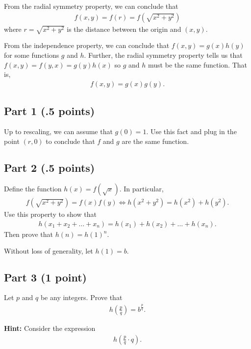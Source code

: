 \documentclass{article}
\begin{document}
From the radial symmetry property, we can conclude that
\begin{align}\label{eq:radial_symmetry}
f(x,y) = f(r) = f(\sqrt{x^2 + y^2})
\end{align}
where $r=\sqrt{x^2+y^2}$ is the distance between the origin and $(x,y)$.

From the independence property, we can conclude that $f(x,y) = g(x) h(y)$ for some functions $g$ and $h$.
Further, the radial symmetry property tells us that $f(x,y) = f(y,x) = g(y) h(x)$ so $g$ and $h$ must be the same function.
That is,
\begin{align}\label{eq:independence}
f(x,y) = g(x) g(y).
\end{align}

\subsection*{Part 1 (.5 points)} 

Up to rescaling, we can assume that $g(0)=1$.
Use this fact and plug in the point $(r,0)$ to conclude that $f$ and $g$ are the same function.

\subsection*{Part 2 (.5 points)}

Define the function $h(x) = f(\sqrt{x})$.
In particular,
\begin{align}\label{eq:define_h}
f(\sqrt{x^2 + y^2}) = f(x) f(y) \Leftrightarrow
h(x^2 + y^2) = h(x^2) + h(y^2).
\end{align}
Use this property to show that
\begin{align}\label{eq:h_linear}
h(x_1 + x_2 + \ldots + x_n) = h(x_1) + h(x_2) + \ldots + h(x_n).
\end{align}
Then prove that $h(n) = h(1)^n$.

Without loss of generality, let $h(1) = b$.

\subsection*{Part 3 (1 point)}

Let $p$ and $q$ be any integers.
Prove that 
\begin{align}\label{eq:to_prove}
h\left(\frac{p}{q}\right) = b^{\frac{p}{q}}.
\end{align}

\textbf{Hint:} Consider the expression
\begin{align*}
h\left(\frac{p}{q} \cdot q \right).
\end{align*}
\end{document}
